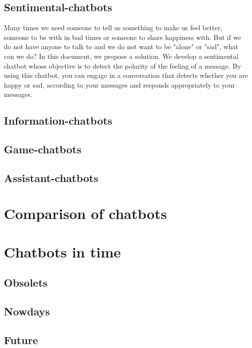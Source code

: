 \documentclass[12pt,twoside]{article}
\theoremstyle{plain}
\theoremstyle{definition}
\theoremstyle{remark}
\begin{document}
	\subsection{Sentimental-chatbots}
	\label{sec:sentimental}
	
	Many times we need someone to tell us something to make us feel better, someone to be with in bad times or someone to share happiness with. But if we do not have anyone to talk to and we do not want to be "alone" or "sad", what can we do? In this document, we propose a solution. We develop a sentimental chatbot whose objective is to detect the polarity of the feeling of a message. By using this chatbot, you can engage in a conversation that detects whether you are happy or sad, according to your messages and responds appropriately to your messages.
	
	

	\subsection{Information-chatbots}
	\label{sec:information}

	\subsection{Game-chatbots}
	\label{sec:game}

	\subsection{Assistant-chatbots}
	\label{sec:assistant}
	

\section{Comparison of chatbots}
\label{sec:comparison}


\section{Chatbots in time}
\label{sec:time}

\subsection{Obsolets}
\label{sec:obsolet}

\subsection{Nowdays}
\label{sec:nowdays}

\subsection{Future}
\label{sec:future}

%
%
\nocite{*}


\newpage


\end{document}
